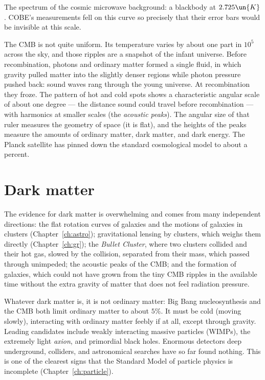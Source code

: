 \begin{center}
\begin{minipage}{\linewidth}
{\small The spectrum of the cosmic microwave background: a blackbody at $2.725\un{K}$. COBE's measurements fell on this curve so precisely that their error bars would be invisible at this scale.}
\end{minipage}
\end{center}

The CMB is not quite uniform. Its temperature varies by about one part in $10^5$ across the sky, and those ripples are a snapshot of the infant universe. Before recombination, photons and ordinary matter formed a single fluid, in which gravity pulled matter into the slightly denser regions while photon pressure pushed back: sound waves rang through the young universe. At recombination they froze. The pattern of hot and cold spots shows a characteristic angular scale of about one degree --- the distance sound could travel before recombination --- with harmonics at smaller scales (the \emph{acoustic peaks}). The angular size of that ruler measures the geometry of space (it is flat), and the heights of the peaks measure the amounts of ordinary matter, dark matter, and dark energy. The Planck satellite has pinned down the standard cosmological model to about a percent.

\section{Dark matter}

The evidence for dark matter is overwhelming and comes from many independent directions: the flat rotation curves of galaxies and the motions of galaxies in clusters (Chapter~\ref{ch:astro}); gravitational lensing by clusters, which weighs them directly (Chapter~\ref{ch:gr}); the \emph{Bullet Cluster}, where two clusters collided and their hot gas, slowed by the collision, separated from their mass, which passed through unimpeded; the acoustic peaks of the CMB; and the formation of galaxies, which could not have grown from the tiny CMB ripples in the available time without the extra gravity of matter that does not feel radiation pressure.

Whatever dark matter is, it is not ordinary matter: Big Bang nucleosynthesis and the CMB both limit ordinary matter to about $5\%$. It must be cold (moving slowly), interacting with ordinary matter feebly if at all, except through gravity. Leading candidates include weakly interacting massive particles (WIMPs), the extremely light \emph{axion}, and primordial black holes. Enormous detectors deep underground, colliders, and astronomical searches have so far found nothing. This is one of the clearest signs that the Standard Model of particle physics is incomplete (Chapter~\ref{ch:particle}).

